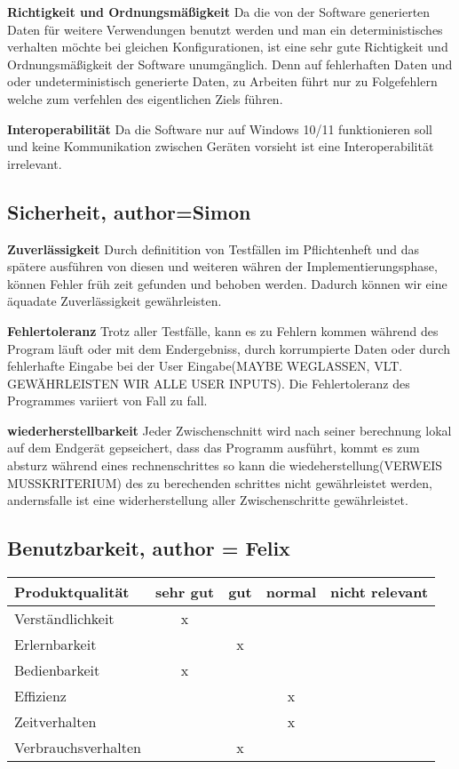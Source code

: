 \documentclass[parskip=full]{scrartcl} %
\begin{document}
\textbf{Richtigkeit und Ordnungsmäßigkeit}
\newline
Da die von der Software generierten Daten für weitere Verwendungen benutzt werden und man ein deterministisches verhalten möchte bei gleichen Konfigurationen, ist eine sehr gute Richtigkeit und Ordnungsmäßigkeit der Software unumgänglich. Denn auf fehlerhaften Daten und oder undeterministisch generierte Daten, zu Arbeiten führt nur zu Folgefehlern welche zum verfehlen des eigentlichen Ziels führen.

\textbf{Interoperabilität}
\newline
Da die Software nur auf Windows 10/11 funktionieren soll und keine Kommunikation zwischen Geräten vorsieht ist eine Interoperabilität irrelevant.





\subsection{Sicherheit, author=Simon}

\textbf{Zuverlässigkeit}
Durch definitition von Testfällen im Pflichtenheft und das spätere ausführen von diesen und weiteren währen der Implementierungsphase, können Fehler früh zeit gefunden und behoben werden.
Dadurch können wir eine äquadate Zuverlässigkeit gewährleisten.

\textbf{Fehlertoleranz}
Trotz aller Testfälle, kann es zu Fehlern kommen während des Program läuft oder mit dem Endergebniss, durch korrumpierte Daten oder durch fehlerhafte Eingabe bei der User Eingabe(MAYBE WEGLASSEN, VLT. GEWÄHRLEISTEN WIR ALLE USER INPUTS).
Die Fehlertoleranz des Programmes variiert von Fall zu fall.

\textbf{wiederherstellbarkeit}
Jeder Zwischenschnitt wird nach seiner berechnung lokal auf dem Endgerät gepseichert, dass das Programm ausführt, kommt es zum absturz während eines rechnenschrittes so kann die wiedeherstellung(VERWEIS MUSSKRITERIUM) des zu berechenden schrittes nicht gewährleistet werden, andernsfalle ist  eine widerherstellung aller Zwischenschritte gewährleistet.


\subsection{Benutzbarkeit, author = Felix}
    \begin{tabular}{|l| c| c| c| c|}
    \hline
        Produktqualität & sehr gut & gut & normal & nicht relevant \\
    \hline
        Verständlichkeit & x & & &\\
    \hline
        Erlernbarkeit & & x & &\\
    \hline
        Bedienbarkeit & x & & &\\
    \hline
        Effizienz & & & x &\\
    \hline
        Zeitverhalten & & & x &\\
    \hline
        Verbrauchsverhalten & & x & &\\
    \hline
    \end{tabular}
\end{document}
